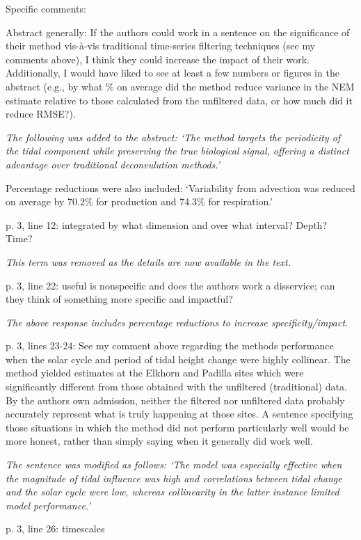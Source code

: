 \documentclass[letterpaper,12pt]{article}\usepackage[]{graphicx}\usepackage[]{color}
\begin{document}
Specific comments:

Abstract generally: If the authors could work in a sentence on the significance of their method vis-à-vis traditional time-series filtering techniques (see my comments above), I think they could increase the impact of their work. Additionally, I would have liked to see at least a few numbers or figures in the abstract (e.g., by what \% on average did the method reduce variance in the NEM estimate relative to those calculated from the unfiltered data, or how much did it reduce RMSE?).

{\it The following was added to the abstract: `The method targets the periodicity of the tidal component while preserving the true biological signal, offering a distinct advantage over traditional deconvulution methods.'

Percentage reductions were also included: `Variability from advection was reduced on average by 70.2\% for production and 74.3\% for respiration.'
}

p. 3, line 12: integrated by what dimension and over what interval? Depth? Time?

{\it This term was removed as the details are now available in the text.}

p. 3, line 22: useful is nonspecific and does the authors work a disservice; can they think of
something more specific and impactful?

{\it The above response includes percentage reductions to increase specificity/impact.}

p. 3, lines 23-24: See my comment above regarding the methods performance when the solar cycle and period of tidal height change were highly collinear. The method yielded estimates at the Elkhorn and Padilla sites which were significantly different from those obtained with the unfiltered (traditional) data. By the authors own admission, neither the filtered nor unfiltered data probably accurately represent what is truly happening at those sites. A sentence specifying those situations in which the method did not perform particularly well would be more honest, rather than simply saying when it generally did work well.

{\it The sentence was modified as follows: `The model was especially effective when the magnitude of tidal influence was high and correlations between tidal change and the solar cycle were low, whereas collinearity in the latter instance limited model performance.'
}

p. 3, line 26: timescales
\end{document}
